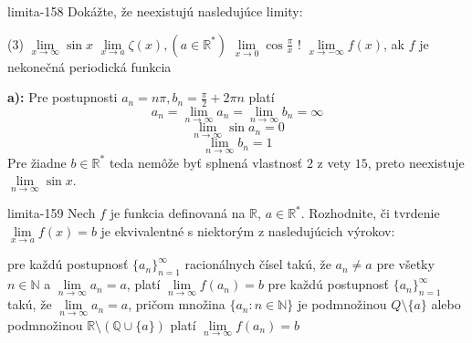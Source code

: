 \begin{defproblem}{limita-158}
Dokážte, že neexistujú nasledujúce limity:
\begin{tasks}(3)
    \task $\lim\limits_{{x \rightarrow \infty}} \sin x$
    \task $\lim\limits_{{x \rightarrow a}} \zeta (x), (a \in \mathbb{R^*})$
    \task $\lim\limits_{{x \rightarrow 0}} \cos \frac{\pi}{x}$
    \task! $\lim\limits_{{x \rightarrow -\infty}} f(x)$, ak $f$ je nekonečná periodická funkcia
\end{tasks}

\begin{solution}
    \textbf{a):}
    Pre postupnosti $a_n=n\pi,b_n=\frac{\pi}{2}+2\pi n$ platí
    \[
        a_n = \lim\limits_{n \rightarrow \infty} a_n
            = \lim\limits_{n \rightarrow \infty} b_n
            = \infty
    \]
    \[
        \lim\limits_{n \rightarrow \infty} \sin a_n=0
    \]
    \[
        \lim\limits_{n \rightarrow \infty} b_n=1
    \]
    Pre žiadne $b \in \mathbb{R}^*$ teda nemôže byť splnená
    vlastnosť $2$ z vety $15$, preto neexistuje $\lim\limits_{n \rightarrow \infty}
    \sin x$.
\end{solution}
\end{defproblem}

\begin{defproblem}{limita-159}
Nech $f$ je funkcia definovaná na $\mathbb{R}$, $a \in \mathbb{R^*}$. Rozhodnite, či tvrdenie $\lim\limits_{x \rightarrow a} f(x)=b$ je ekvivalentné s niektorým z nasledujúcich výrokov:
\begin{tasks}
\task pre každú postupnosť ${\{a_n\}}_{n=1}^\infty$ racionálnych čísel takú, že $a_n \neq a$ pre všetky $n \in \mathbb{N}$ a $\lim\limits_{n \rightarrow \infty} a_n=a$, platí $\lim\limits_{n \rightarrow \infty} f(a_n)=b$
\task pre každú postupnosť ${\{a_n\}}_{n=1}^\infty$ takú, že $\lim\limits_{n \rightarrow \infty} a_n=a$, pričom množina $\{ a_n : n\in \mathbb{N }\}$ je podmnožinou $Q \setminus \{ a\}$ alebo podmnožinou $\mathbb{R} \setminus (\mathbb{Q} \cup \{ a\})$ platí $\lim\limits_{n \rightarrow \infty} f(a_n)=b$
\end{tasks}
\end{defproblem}

